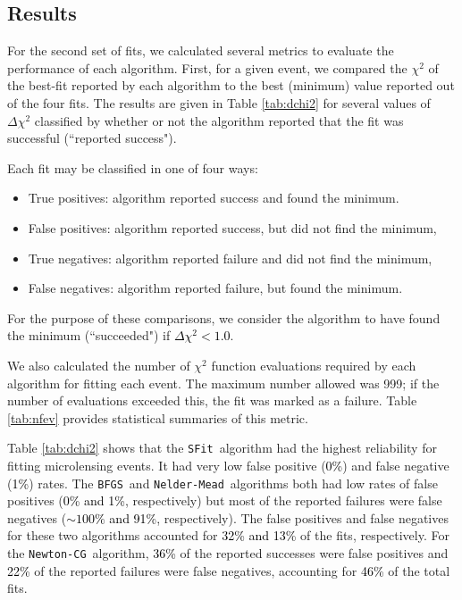 \documentclass[preprint]{aastex631}
\newcommand{\num}[1]{\textcolor{black}{#1}}
\newcommand{\neldermead}{\texttt{Nelder-Mead}}
\newcommand{\newtoncg}{\texttt{Newton-CG}}
\newcommand{\bfgs}{\texttt{BFGS}}
\newcommand{\sfit}{\texttt{SFit}}
\begin{document}
\subsection{Results}

For the second set of fits, we calculated several metrics to evaluate the performance of each algorithm. First, for a given event, we compared the $\chi^2$ of the best-fit reported by each algorithm to the best (minimum) value reported out of the four fits. The results are given in Table \ref{tab:dchi2} for several values of $\Delta\chi^2$ classified by whether or not the algorithm reported that the fit was successful (``reported success").

Each fit may be classified in one of four ways:
\begin{itemize}
\item{True positives: algorithm reported success and found the minimum.}
\item{False positives: algorithm reported success, but did not find the minimum,}
\item{True negatives: algorithm reported failure and did not find the minimum,}
\item{False negatives: algorithm reported failure, but found the minimum.}
\end{itemize}
For the purpose of these comparisons, we consider the algorithm to have found the minimum (``succeeded") if \num{$\Delta\chi^2 < 1.0$}.

We also calculated the number of $\chi^2$ function evaluations required by each algorithm for fitting each event. The maximum  number allowed was 999; if the number of evaluations exceeded this, the fit was marked as a failure. Table \ref{tab:nfev} provides statistical summaries of this metric.

Table \ref{tab:dchi2} shows that the \sfit\, algorithm had the highest reliability for fitting microlensing events. It had very low false positive (\num{0\%}) and false negative (\num{1\%}) rates. The \bfgs\, and \neldermead\, algorithms both had low rates of false positives (\num{0\% and 1\%}, respectively) but most of the reported failures were false negatives (\num{$\sim 100\%$ and 91\%}, respectively). The false positives and false negatives for these two algorithms accounted for \num{32\% and 13\%} of the fits, respectively. For the \newtoncg\, algorithm, \num{36\%} of the reported successes were false positives and \num{22\%} of the reported failures were false negatives, accounting for \num{46\%} of the total fits. 
\end{document}
